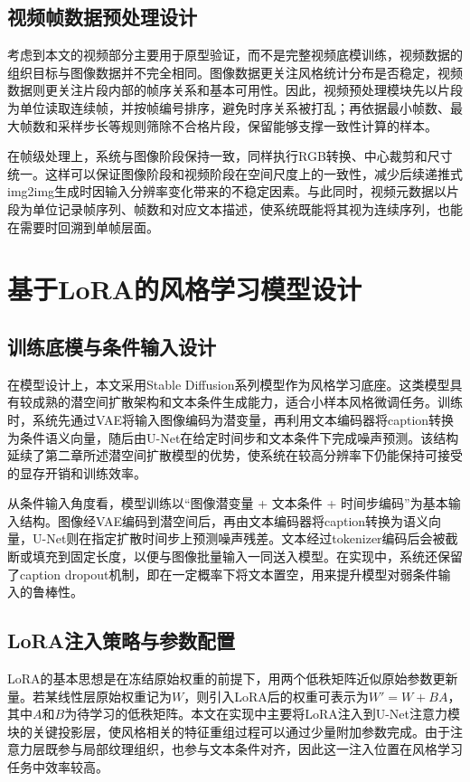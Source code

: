 \subsection{视频帧数据预处理设计}

考虑到本文的视频部分主要用于原型验证，而不是完整视频底模训练，视频数据的组织目标与图像数据并不完全相同。图像数据更关注风格统计分布是否稳定，视频数据则更关注片段内部的帧序关系和基本可用性。因此，视频预处理模块先以片段为单位读取连续帧，并按帧编号排序，避免时序关系被打乱；再依据最小帧数、最大帧数和采样步长等规则筛除不合格片段，保留能够支撑一致性计算的样本。

在帧级处理上，系统与图像阶段保持一致，同样执行RGB转换、中心裁剪和尺寸统一。这样可以保证图像阶段和视频阶段在空间尺度上的一致性，减少后续递推式img2img生成时因输入分辨率变化带来的不稳定因素。与此同时，视频元数据以片段为单位记录帧序列、帧数和对应文本描述，使系统既能将其视为连续序列，也能在需要时回溯到单帧层面。

\section{基于LoRA的风格学习模型设计}

\subsection{训练底模与条件输入设计}

在模型设计上，本文采用Stable Diffusion系列模型作为风格学习底座。这类模型具有较成熟的潜空间扩散架构和文本条件生成能力，适合小样本风格微调任务。训练时，系统先通过VAE将输入图像编码为潜变量，再利用文本编码器将caption转换为条件语义向量，随后由U-Net在给定时间步和文本条件下完成噪声预测。该结构延续了第二章所述潜空间扩散模型的优势，使系统在较高分辨率下仍能保持可接受的显存开销和训练效率。

从条件输入角度看，模型训练以“图像潜变量 + 文本条件 + 时间步编码”为基本输入结构。图像经VAE编码到潜空间后，再由文本编码器将caption转换为语义向量，U-Net则在指定扩散时间步上预测噪声残差。文本经过tokenizer编码后会被截断或填充到固定长度，以便与图像批量输入一同送入模型。在实现中，系统还保留了caption dropout机制，即在一定概率下将文本置空，用来提升模型对弱条件输入的鲁棒性。

\subsection{LoRA注入策略与参数配置}

LoRA的基本思想是在冻结原始权重的前提下，用两个低秩矩阵近似原始参数更新量。若某线性层原始权重记为$W$，则引入LoRA后的权重可表示为$W' = W + BA$，其中$A$和$B$为待学习的低秩矩阵。本文在实现中主要将LoRA注入到U-Net注意力模块的关键投影层，使风格相关的特征重组过程可以通过少量附加参数完成。由于注意力层既参与局部纹理组织，也参与文本条件对齐，因此这一注入位置在风格学习任务中效率较高。

